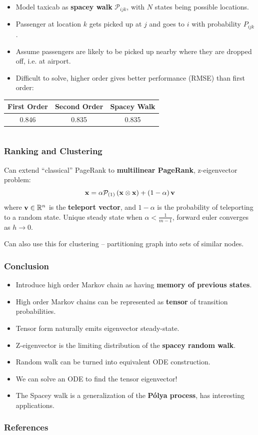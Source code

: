 \documentclass{beamer}
\begin{document}
\begin{frame}
\begin{columns}
		\begin{column}{0.7\linewidth}
		\begin{itemize}
			\item Model taxicab as \textbf{spacey walk} $\mathcal{P}_{ijk}$, with $N$ states being possible locations.
			\item Passenger at location $k$ gets picked up at $j$ and goes to $i$ with probability $P_{ijk}$.
			\item Assume passengers are likely to be picked up nearby where they are dropped off, i.e. at airport.
			\item Difficult to solve, higher order gives better performance (RMSE) than first order:
		\end{itemize}
		\begin{tabular}{|ccc|}
			\hline
			First Order & Second Order & Spacey Walk \\
			\hline
			0.846 & 0.835 & 0.835 \\
			\hline
		\end{tabular}
		\end{column}
	\end{columns}
\end{frame}

\begin{frame}
  \frametitle{Ranking and Clustering}
  Can extend ``classical'' PageRank to \textbf{multilinear PageRank}, z-eigenvector problem:
  \[ {\bf x} = \alpha\mathcal{P}_{\left(1\right)} \left({\bf x} \otimes {\bf x}\right) + \left(1-\alpha\right)\mathbf{v} \]
  where ${\bf v} \in \mathbb{R}^n$ is the \textbf{teleport vector}, and $1-\alpha$ is the probability of teleporting to a random state. Unique steady state when $\alpha<\frac{1}{m-1}$, forward euler converges as $h\to 0$.
  \newline\newline\par
  Can also use this for clustering -- partitioning graph into sets of similar nodes.
\end{frame}

\begin{frame}
	\frametitle{Conclusion}
	\begin{itemize}
		\item Introduce high order Markov chain as having \textbf{memory of previous states}.
		\item High order Markov chains can be represented as \textbf{tensor} of transition probabilities.
		\item Tensor form naturally emits eigenvector steady-state.
		\item Z-eigenvector is the limiting distribution of the \textbf{spacey random walk}.
		\item Random walk can be turned into equivalent ODE construction.
		\item We can solve an ODE to find the tensor eigenvector!
		\item The Spacey walk is a generalization of the \textbf{P\'{o}lya process}, has interesting applications.
	\end{itemize}
\end{frame}


\begin{frame}
\frametitle{References}
\nocite*{}


\end{frame}
\end{document}
